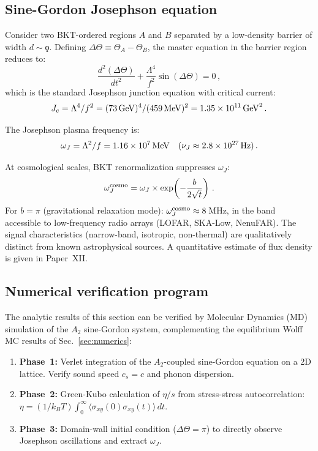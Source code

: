 ﻿\documentclass[twocolumn,showpacs,preprintnumbers,amsmath,amssymb,prd]{revtex4-2}
\begin{document}
\subsection{Sine-Gordon Josephson equation}
\label{sec:josephson}

Consider two BKT-ordered regions $A$ and $B$ separated by a low-density barrier of width $d \sim \koppa$. Defining $\Delta\Theta \equiv \Theta_A - \Theta_B$, the master equation in the barrier region reduces to:
\begin{equation}
\frac{d^2(\Delta\Theta)}{dt^2} + \frac{\Lambda^4}{f^2}\sin(\Delta\Theta) = 0\,,
\label{eq:josephson_eq}
\end{equation}
which is the standard Josephson junction equation with critical current:
\begin{equation}
J_c = \Lambda^4/f^2 = (73\,{\rm GeV})^4/(459\,{\rm MeV})^2 = 1.35\times10^{11}\,{\rm GeV}^2\,.
\end{equation}

The Josephson plasma frequency is:
\begin{equation}
\omega_J = \Lambda^2/f = 1.16\times10^7\,{\rm MeV} \quad (\nu_J \approx 2.8\times10^{27}\,{\rm Hz})\,.
\end{equation}

At cosmological scales, BKT renormalization suppresses $\omega_J$:
\begin{equation}
\omega_J^{\rm cosmo} = \omega_J \times \exp\!\left(-\frac{b}{2\sqrt{t}}\right)\,.
\label{eq:omega_cosmo}
\end{equation}
For $b = \pi$ (gravitational relaxation mode): $\omega_J^{\rm cosmo} \approx 8\,$MHz, in the band accessible to low-frequency radio arrays (LOFAR, SKA-Low, NenuFAR). The signal characteristics (narrow-band, isotropic, non-thermal) are qualitatively distinct from known astrophysical sources. A quantitative estimate of flux density is given in Paper~XII.

\subsection{Numerical verification program}

The analytic results of this section can be verified by Molecular Dynamics (MD) simulation of the $A_2$ sine-Gordon system, complementing the equilibrium Wolff MC results of Sec.~\ref{sec:numerics}:
\begin{enumerate}
\item \textbf{Phase~1:} Verlet integration of the $A_2$-coupled sine-Gordon equation on a 2D lattice. Verify sound speed $c_s = c$ and phonon dispersion.
\item \textbf{Phase~2:} Green-Kubo calculation of $\eta/s$ from stress-stress autocorrelation: $\eta = (1/k_B T)\int_0^\infty \langle\sigma_{xy}(0)\sigma_{xy}(t)\rangle\,dt$.
\item \textbf{Phase~3:} Domain-wall initial condition ($\Delta\Theta = \pi$) to directly observe Josephson oscillations and extract $\omega_J$.
\end{enumerate}
\end{document}
